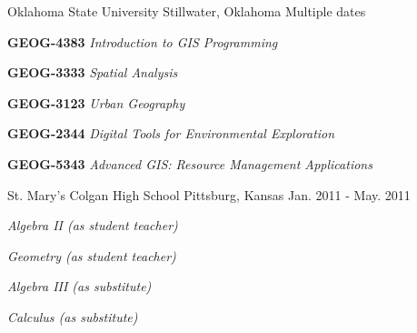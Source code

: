   \begin{cventries}
      
    \cventry
      {}
      {Oklahoma State University}
      {Stillwater, Oklahoma}
      {Multiple dates}
      {
        \vspace{-3mm}
        \begin{expitems}
        \item {\textbf{GEOG-4383} \textit{Introduction to GIS Programming}}
        \item {\textbf{GEOG-3333} \textit{Spatial Analysis}}
        \item {\textbf{GEOG-3123} \textit{Urban Geography}}
        \item {\textbf{GEOG-2344} \textit{Digital Tools for Environmental Exploration}}
        \item {\textbf{GEOG-5343} \textit{Advanced GIS: Resource Management Applications}}
        \end{expitems}
      }

    \cventry
      {}
      {St. Mary's Colgan High School}
      {Pittsburg, Kansas}
      {Jan. 2011 - May. 2011}
      {
        \vspace{-3mm}
        \begin{expitems}
        \item {\textit{Algebra II (as student teacher)}}
        \item {\textit{Geometry (as student teacher)}}
        \item {\textit{Algebra III (as substitute)}}
        \item {\textit{Calculus (as substitute)}}
        \end{expitems}
      }

  \end{cventries}